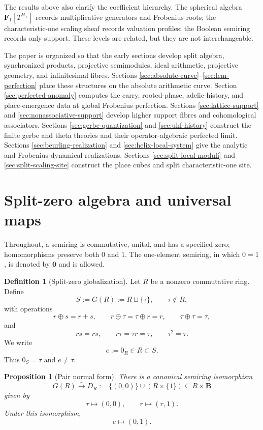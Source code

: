 \documentclass[11pt]{amsart}
\numberwithin{equation}{section}
\newtheorem{proposition}[theorem]{Proposition}
\theoremstyle{definition}
\newtheorem{definition}[theorem]{Definition}
\newcommand{\B}{\mathbf B}
\newcommand{\Fone}{\mathbf F_1}
\newcommand{\zero}{\mathbf 0}
\begin{document}
The results above also clarify the coefficient hierarchy.  The spherical
algebra $\Fone[T^{H_+}]$ records multiplicative generators and Frobenius
roots; the characteristic-one scaling sheaf records valuation profiles;
the Boolean semiring records only support.  These levels are related, but
they are not interchangeable.

The paper is organized so that the early sections develop split algebra,
synchronized products, projective semimodules, ideal arithmetic,
projective geometry, and infinitesimal fibres.  Sections
\ref{sec:absolute-curve}--\ref{sec:lcm-perfection} place these structures on
the absolute arithmetic curve.  Section \ref{sec:perfected-anomaly}
computes the carry, rooted-phase, adelic-history, and place-emergence data
at global Frobenius perfection.  Sections \ref{sec:lattice-support} and
\ref{sec:nonassociative-support} develop higher support fibres and
cohomological associators.  Sections \ref{sec:gerbe-quantization} and
\ref{sec:uhf-history} construct the finite gerbe and theta theories and
their operator-algebraic perfected limit.  Sections \ref{sec:beurling-realization}
and \ref{sec:helix-local-system} give the analytic and
Frobenius-dynamical realizations.  Sections \ref{sec:split-local-moduli}
and \ref{sec:split-scaling-site} construct the place cubes and split
characteristic-one site.

\section{Split-zero algebra and universal maps}

Throughout, a semiring is commutative, unital, and has a specified zero; homomorphisms preserve both $0$ and $1$.  The one-element semiring, in which $0=1$, is denoted by $\zero$ and is allowed.

\begin{definition}[Split-zero globalization]
Let $R$ be a nonzero commutative ring.  Define
\[
S:=G(R):=R\sqcup\{\tau\},
\qquad \tau\notin R,
\]
with operations
\[
r\oplus s=r+s,
\qquad
r\oplus\tau=\tau\oplus r=r,
\qquad
\tau\oplus\tau=\tau,
\]
and
\[
rs=rs,
\qquad
r\tau=\tau r=\tau,
\qquad
\tau^2=\tau.
\]
We write
\[
e:=0_R\in R\subset S.
\]
Thus $0_S=\tau$ and $e\neq\tau$.
\end{definition}

\begin{proposition}[Pair normal form]\label{prop:pair-normal-form}
There is a canonical semiring isomorphism
\[
G(R)\xrightarrow{\sim}
D_R:=\{(0,0)\}\cup(R\times\{1\})
\subseteq R\times\B
\]
given by
\[
\tau\longmapsto(0,0),
\qquad
r\longmapsto(r,1).
\]
Under this isomorphism,
\[
e\longmapsto(0,1).
\]
\end{proposition}
\end{document}
